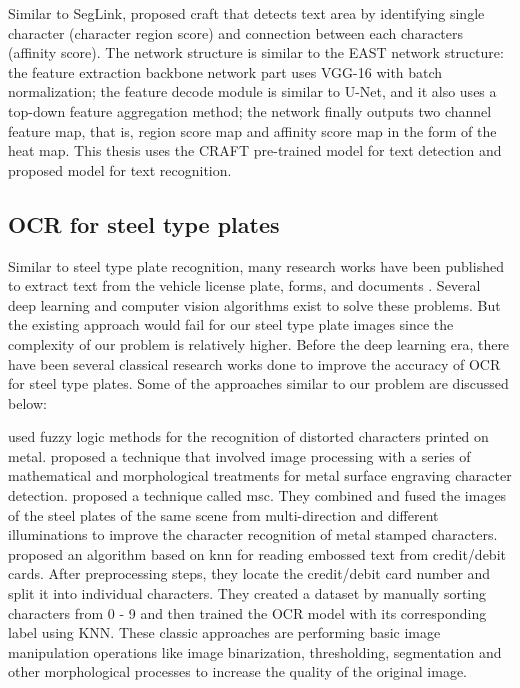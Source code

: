 	Similar to SegLink, \cite{baek2019character} proposed \gls{craft} that detects text area by identifying single character (character region score) and connection between each characters (affinity score). The network structure is similar to the EAST network structure: the feature extraction backbone network part uses VGG-16 with batch normalization; the feature decode module is similar to U-Net, and it also uses a top-down feature aggregation method; the network finally outputs two channel feature map, that is, region score map and affinity score map in the form of the heat map. This thesis uses the CRAFT pre-trained model for text detection and \cite{baek2019wrong} proposed model for text recognition.

\subsection{OCR for steel type plates}

	Similar to steel type plate recognition, many research works have been published to extract text from the vehicle license plate, forms, and documents \citep{duan2005building,zang2015vehicle,impedovo2012fundamentals,
milewski2006extraction,laroca2018robust}. Several deep learning and computer vision algorithms exist to solve these problems. But the existing approach would fail for our steel type plate images since the complexity of our problem is relatively higher. 
Before the deep learning era, there have been several classical research works done to improve the accuracy of OCR for steel type plates. Some of the approaches similar to our problem are discussed below: 
\newline
	
	\cite{novak2013recognition} used fuzzy logic methods for the recognition of distorted characters printed on metal. \cite{yu2017engraving} proposed a technique that involved image processing with a series of mathematical and morphological treatments for metal surface engraving character detection.  \cite{xiang2018metal} proposed a technique called \gls{msc}. They combined and fused the images of the steel plates of the same scene from multi-direction and different illuminations to improve the character recognition of metal stamped characters. \cite{raka2019ocr} proposed an algorithm based on \gls{knn} for reading embossed text from credit/debit cards. After preprocessing steps, they locate the credit/debit card number and split it into individual characters. They created a dataset by manually sorting characters from 0 - 9 and then trained the OCR model with its corresponding label using KNN. These classic approaches are performing basic image manipulation operations like image binarization, thresholding, segmentation and other morphological processes to increase the quality of the original image. 
\newline

